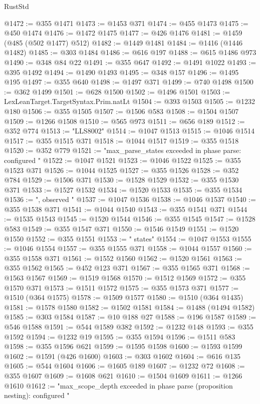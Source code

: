 \begin{lexlean}{RustStd}
\begin{coremodule}
@1472 := @355 @1471
@1473 := @1453 @371
@1474 := @455 @1473
@1475 := @450 @1474
@1476 := @1472 @1475
@1477 := @426 @1476
@1481 := @1459 (@485 (@502 @1477) @512)
@1482 := @1449 @1481
@1484 := @1416 (@1446 @1482)
@1485 := @303 @1484
@1486 := @616 @197
@1488 := @615 @1486 @973
@1490 := @348 @84 @22
@1491 := @355 @647
@1492 := @1491 @1022
@1493 := @395 @1492
@1494 := @1490 @1493
@1495 := @348 @157
@1496 := @1495 @195
@1497 := @355 @640
@1498 := @1497 @371
@1499 := @740 @1498
@1500 := @362 @1499
@1501 := @628 @1500
@1502 := @1496 @1501
@1503 := LexLeanTarget.TargetSyntax.Prim.natLt
@1504 := @393 @1503
@1505 := @1232 @180
@1506 := @355 @1505
@1507 := @1506 @583
@1508 := @1504 @1507
@1509 := @1266 @1508
@1510 := @565 @973
@1511 := @656 @189
@1512 := @352 @774
@1513 := "LLS8002"
@1514 := @1047 @1513
@1515 := @1046 @1514
@1517 := @355 @1515 @371
@1518 := @1044 @1517
@1519 := @355 @1518
@1520 := @352 @779
@1521 := "max_parse_states exceeded in phase parse: configured "
@1522 := @1047 @1521
@1523 := @1046 @1522
@1525 := @355 @1523 @371
@1526 := @1044 @1525
@1527 := @355 @1526
@1528 := @352 @784
@1529 := @1506 @371
@1530 := @1528 @1529
@1532 := @355 @1530 @371
@1533 := @1527 @1532
@1534 := @1520 @1533
@1535 := @355 @1534
@1536 := ", observed "
@1537 := @1047 @1536
@1538 := @1046 @1537
@1540 := @355 @1538 @371
@1541 := @1044 @1540
@1543 := @355 @1541 @371
@1544 := @1535 @1543
@1545 := @1520 @1544
@1546 := @355 @1545
@1547 := @1528 @583
@1549 := @355 @1547 @371
@1550 := @1546 @1549
@1551 := @1520 @1550
@1552 := @355 @1551
@1553 := " states"
@1554 := @1047 @1553
@1555 := @1046 @1554
@1557 := @355 @1555 @371
@1558 := @1044 @1557
@1560 := @355 @1558 @371
@1561 := @1552 @1560
@1562 := @1520 @1561
@1563 := @355 @1562
@1565 := @452 @123 @371
@1567 := @355 @1565 @371
@1568 := @1563 @1567
@1569 := @1519 @1568
@1570 := @1512 @1569
@1572 := @355 @1570 @371
@1573 := @1511 @1572
@1575 := @355 @1573 @371
@1577 := @1510 (@364 @1575)
@1578 := @1509 @1577
@1580 := @1510 (@364 @1435)
@1581 := @1578 @1580
@1582 := @1502 @1581
@1584 := @1488 (@1494 @1582)
@1585 := @303 @1584
@1587 := @10 @188 @27
@1588 := @196 @1587
@1589 := @546 @1588
@1591 := @544 @1589 @382
@1592 := @1232 @148
@1593 := @355 @1592
@1594 := @1232 @19
@1595 := @355 @1594
@1596 := @1511 @583
@1598 := @355 @1596 @621
@1599 := @1595 @1598
@1600 := @1593 @1599
@1602 := @1591 (@426 @1600)
@1603 := @303 @1602
@1604 := @616 @135
@1605 := @544 @1604
@1606 := @1605 @189
@1607 := @1232 @72
@1608 := @355 @1607
@1609 := @1608 @621
@1610 := @1504 @1609
@1611 := @1266 @1610
@1612 := "max_scope_depth exceeded in phase parse (proposition nesting): configured "

\end{coremodule}
\end{lexlean}
